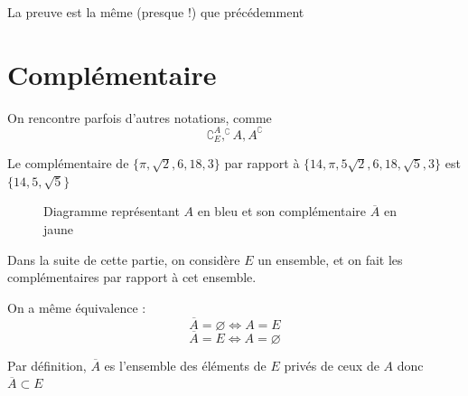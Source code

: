 \begin{preuve}
La preuve est la même (presque !) que précédemment
\end{preuve}
\section{Complémentaire}
\newline

On rencontre parfois d'autres notations, comme 
$$\complement_E^A, ^\complement A, A^\complement$$

\begin{exemple}
Le complémentaire de $\{\pi,\sqrt{2},6,18,3\}$ par rapport à $\{14,\pi,5\sqrt{2},6,18,\sqrt{5},3\}$ est $\{14,5,\sqrt{5}\}$
\end{exemple}
\begin{figure}[H]
\centering
{}
\caption{Diagramme représentant $A$ en bleu et son complémentaire $\overline{A}$ en jaune}
\end{figure}

Dans la suite de cette partie, on considère $E$ un ensemble, et on fait les complémentaires par rapport à cet ensemble. \newline

\newline

On a même équivalence : 
$$\overline{A} = \varnothing \Leftrightarrow A = E$$
$$\overline{A} = E \Leftrightarrow A = \varnothing$$

\newline


\newline

\begin{preuve}
Par définition, $\overline{A}$ es l'ensemble des éléments de $E$ privés de ceux de $A$ donc $\overline{A} \subset E$ 
\end{preuve}

